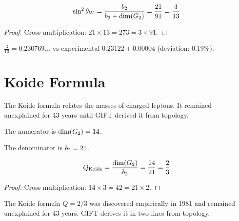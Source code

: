 \begin{theorem}\label{thm:weinberg_angle}
    \leanok
    \[
        \sin^2\theta_W = \frac{b_2}{b_3 + \mathrm{dim}(G_2)} = \frac{21}{91} = \frac{3}{13}
    \]
\end{theorem}
\begin{proof}
    Cross-multiplication: $21 \times 13 = 273 = 3 \times 91$.
\end{proof}

\begin{theorem}\label{thm:weinberg_simplified}
    \leanok
    $\frac{3}{13} = 0.230769\ldots$ vs experimental $0.23122 \pm 0.00004$
    (deviation: 0.19\%).
\end{theorem}

\section{Koide Formula}

The Koide formula relates the masses of charged leptons. It remained unexplained
for 43 years until GIFT derived it from topology.

\begin{definition}\label{def:koide_num}
    \leanok
    The numerator is $\mathrm{dim}(G_2) = 14$.
\end{definition}

\begin{definition}\label{def:koide_den}
    \leanok
    The denominator is $b_2 = 21$.
\end{definition}

\begin{theorem}\label{thm:koide_formula}
    \leanok
    \[
        Q_{\mathrm{Koide}} = \frac{\mathrm{dim}(G_2)}{b_2} = \frac{14}{21} = \frac{2}{3}
    \]
\end{theorem}
\begin{proof}
    Cross-multiplication: $14 \times 3 = 42 = 21 \times 2$.
\end{proof}

\begin{remark}
    The Koide formula $Q = 2/3$ was discovered empirically in 1981 and remained
    unexplained for 43 years. GIFT derives it in two lines from topology.
\end{remark}

